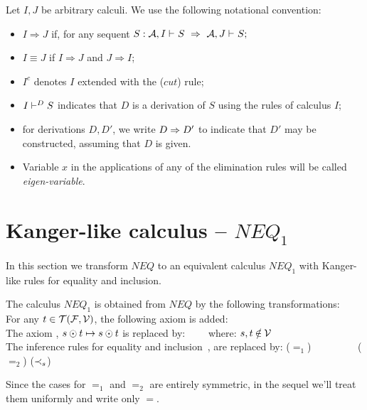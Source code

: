%
\begin{DEFINITION} Let $I, J$ be arbitrary
calculi. We use the following notational convention:
\begin{itemize}\MyLPar
\item $I \Rightarrow J$ if, for any sequent $S : {{\cal {A}}, I}\vdash^{{}}S 
\ \Rightarrow\  {{\cal {A}}, J}\vdash^{{}}S;$
\item $I\equiv J$ if $I\Rightarrow J$ and $J\Rightarrow I$;
\item $I^c$ denotes $I$ extended with the 
($cut$) rule;
\item ${I}\vdash^{{D}}S$ indicates that $D$ is a derivation of $S$ 
using the rules of calculus $I$;
\item for derivations $D, D'$, we write $D\mathrel\Rightarrow D'$ to indicate that $D'$
may be constructed, assuming that $D$ is given.
\item Variable $x$ in the applications of any of the elimination rules will be called
{\em eigen-variable}.
\end{itemize}
\end{DEFINITION}

\section{Kanger-like calculus -- $NEQ_1$}\label{se:neq1}
In this section we transform $NEQ$ to an equivalent calculus $NEQ_1$ 
with Kanger-like rules for equality \cite{K} and inclusion.

\begin{DEFINITION} \label{de:neq1}
The calculus $NEQ_1$ is obtained from $NEQ$ by the following transformations:\\
\noindent For any $t\in{\cal T}({\cal F},\mbox{$\cal V$})$, the following axiom is added:
 \label{ru:neq1tint}\\[4pt]
\noindent The axiom , $s\odot t\mathrel{\mapsto} s\odot t$ is replaced by:
\label{ru:neq1id}\ \ \ \ where: $s,t\not\in\C V$\\[4pt]
\noindent The inference rules for equality and inclusion~, 
 are replaced by:
 ($=_1$)
\label{ru:K12} \ \ \ \ \ \ \ \ 
 ($=_2$)
\PROOFRULE{\Gamma, s\Incl t\Seq \Delta, w(t)\preceq q}{\Gamma, s\Incl t\Seq
\Delta, w(s)\preceq q} ($\mathbin{\prec}_s$)
\label{ru:Kincl}
\end{DEFINITION}
\noindent
Since the cases for $=_1$ and $=_2$ are entirely symmetric,
in the sequel we'll treat them uniformly and write only $=$.

